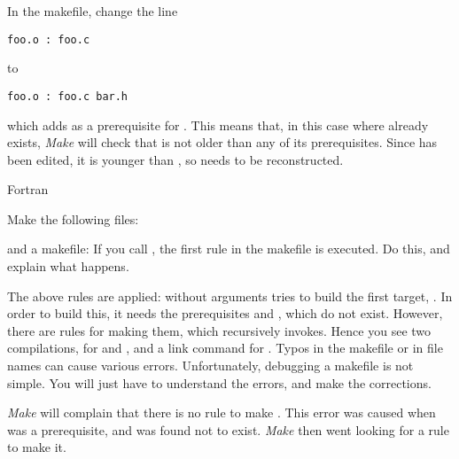 
In the makefile, change the line
\begin{verbatim}
foo.o : foo.c
\end{verbatim}
to
\begin{verbatim}
foo.o : foo.c bar.h
\end{verbatim}
which adds  as a prerequisite for . This means that,
in this case where  already exists, \emph{Make} will check
that  is not older than any of its prerequisites. Since
 has been edited, it is younger than , so 
needs to be reconstructed.


 {Fortran}

Make the following files:

and a makefile:
If you call , the first rule in the makefile is executed. Do
this, and explain what happens.

  {The above rules are applied:  without arguments tries to
    build the first target, . In order to build this, it
    needs the prerequisites  and , which do not
    exist. However, there are rules for making them, which 
    recursively invokes. Hence you see two compilations, for 
    and , and a link command for .}
  {Typos in the makefile or in file names can cause various
    errors. Unfortunately, debugging a makefile is not simple. You
    will just have to understand the errors, and make the
    corrections.}

  {\emph{Make} will complain that there is no rule to make
    . This error was caused when  was a
    prerequisite, and was found not to exist. \emph{Make} then went
    looking for a rule to make it.}{}

